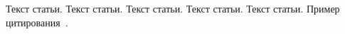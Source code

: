 Текст статьи.
Текст статьи.
Текст статьи.
Текст статьи.
Текст статьи.
Пример цитирования~\cite{колмогоров1950основные, колмогоров1983комбинаторные, GithubSource_2022, Sloane_theencyclopedia}.